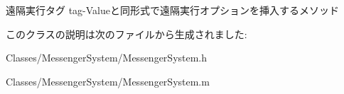 \label{dc/dc9/interface_messenger_system_ad7b796c0354f4a6f380392421d4abc0d}
遠隔実行タグ tag-\/Valueと同形式で遠隔実行オプションを挿入するメソッド 

このクラスの説明は次のファイルから生成されました:\begin{DoxyCompactItemize}
\item 
Classes/MessengerSystem/MessengerSystem.h\item 
Classes/MessengerSystem/MessengerSystem.m\end{DoxyCompactItemize}
